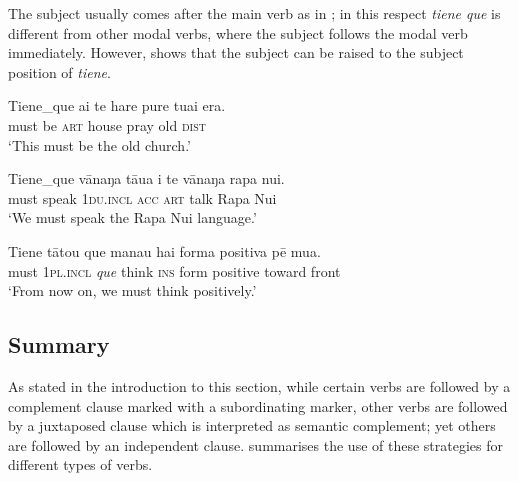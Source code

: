 The subject usually comes after the main verb as in ; in this respect \textit{tiene que} is different from other modal verbs, where the subject follows the modal verb immediately. However,  shows that the subject can be raised to the subject position of \textit{tiene}.

\ea\label{ex:11.85}
\gll Tiene\_que ai te hare pure tuai era.\\
must be \textsc{art} house pray old \textsc{dist}\\

\glt 
‘This must be the old church.’ \textstyleExampleref{[R416.060]} 
\z

\ea\label{ex:11.86}
\gll Tiene\_que vānaŋa tāua i te vānaŋa rapa nui. \\
must speak \textsc{1du.incl} \textsc{acc} \textsc{art} talk Rapa Nui \\

\glt 
‘We must speak the Rapa Nui language.’  
\z

\ea\label{ex:11.87}
\gll Tiene tātou que mana{\ꞌ}u hai forma positiva pē mu{\ꞌ}a. \\
must \textsc{1pl.incl} \textit{que} think \textsc{ins} form positive toward front \\

\glt 
‘From now on, we must think positively.’  
\z
{}

\subsection{Summary}\label{sec:11.3.7}

As stated in the introduction to this section, while certain verbs are followed by a complement clause marked with a subordinating marker, other verbs are followed by a juxtaposed clause which is interpreted as semantic complement; yet others are followed by an independent clause.  summarises the use of these strategies for different types of verbs.

